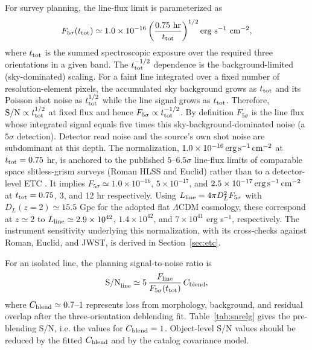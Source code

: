 \documentclass[10pt,onecolumn]{article}
\begin{document}
For survey planning, the line-flux limit is parameterized as
\begin{equation}
  F_{5\sigma}(t_{\rm tot})\simeq
  1.0\times10^{-16}
  \left(\frac{0.75\ {\rm hr}}{t_{\rm tot}}\right)^{1/2}
  {\rm erg\ s^{-1}\ cm^{-2}},
  \label{eq:f5sigma}
\end{equation}
where $t_{\rm tot}$ is the summed spectroscopic exposure over the required three orientations in a given band. The $t_{\rm tot}^{-1/2}$ dependence is the background-limited (sky-dominated) scaling. For a faint line integrated over a fixed number of resolution-element pixels, the accumulated sky background grows as $t_{\rm tot}$ and its Poisson shot noise as $t_{\rm tot}^{1/2}$ while the line signal grows as $t_{\rm tot}$. Therefore, ${\rm S/N}\propto t_{\rm tot}^{1/2}$ at fixed flux and hence $F_{5\sigma}\propto t_{\rm tot}^{-1/2}$. By definition $F_{5\sigma}$ is the line flux whose integrated signal equals five times this sky-background-dominated noise (a $5\sigma$ detection). Detector read noise and the source's own shot noise are subdominant at this depth. The normalization, $1.0\times10^{-16}\,{\rm erg\,s^{-1}\,cm^{-2}}$ at $t_{\rm tot}=0.75$ hr, is anchored to the published $5$--$6.5\sigma$ line-flux limits of comparable space slitless-grism surveys (Roman HLSS and Euclid) rather than to a detector-level ETC \cite{wang2021,euclid2011}. It implies $F_{5\sigma}\simeq1.0\times10^{-16}$, $5\times10^{-17}$, and $2.5\times10^{-17}\,{\rm erg\,s^{-1}\,cm^{-2}}$ at $t_{\rm tot}=0.75$, 3, and 12 hr respectively. Using $L_{\rm line}=4\pi D_L^2 F_{5\sigma}$ with $D_L(z=2)\simeq15.5$ Gpc for the adopted flat $\Lambda$CDM cosmology, these correspond at $z\simeq2$ to $L_{\rm line}\simeq2.9\times10^{42}$, $1.4\times10^{42}$, and $7\times10^{41}$ erg s$^{-1}$, respectively. The instrument sensitivity underlying this normalization, with its cross-checks against Roman, Euclid, and JWST, is derived in Section~\ref{sec:etc}.

For an isolated line, the planning signal-to-noise ratio is
\begin{equation}
  {\rm S/N}_{\rm line}\simeq 5\,\frac{F_{\rm line}}{F_{5\sigma}(t_{\rm tot})}\,C_{\rm blend},
  \label{eq:snline}
\end{equation}
where $C_{\rm blend}\simeq0.7$--1 represents loss from morphology, background, and residual overlap after the three-orientation deblending fit. Table~\ref{tab:snrelg} gives the pre-blending S/N, i.e. the values for $C_{\rm blend}=1$. Object-level S/N values should be reduced by the fitted $C_{\rm blend}$ and by the catalog covariance model.
\end{document}
